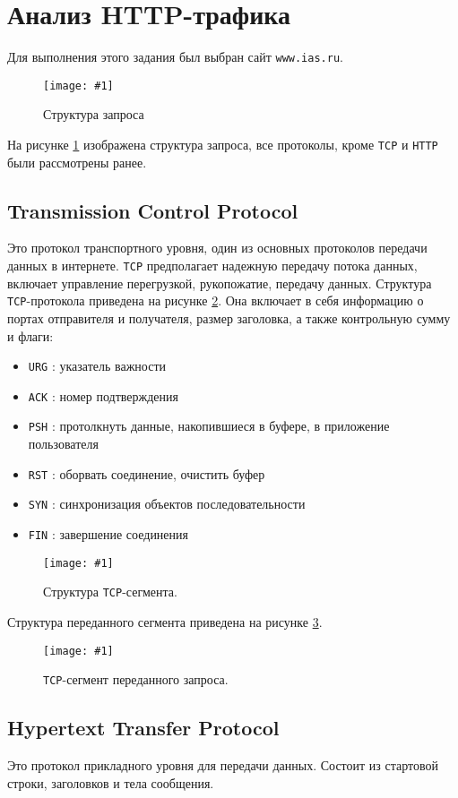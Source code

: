 \documentclass[12pt, a4paper]{article}
\newcommand{\figc}[4]{
  \begin{figure}[h]
  \begin{center}
    \texttt{[image: \#1]}
    \caption{#2}
    \label{fig:#3}
  \end{center}
  \end{figure}
}
\begin{document}
\section{Анализ HTTP-трафика}

Для выполнения этого задания был выбран сайт \texttt{www.ias.ru}.

\figc{http_headers}{Структура запроса}{h_h}{3.0}

На рисунке \ref{fig:h_h} изображена структура запроса, все протоколы, кроме
\texttt{TCP} и \texttt{HTTP} были рассмотрены ранее.

\subsection{Transmission Control Protocol}

Это протокол транспортного уровня, один из основных протоколов передачи данных
в интернете. \texttt{TCP} предполагает надежную передачу потока данных, включает
управление перегрузкой, рукопожатие, передачу данных. Структура \texttt{TCP}-протокола
приведена на рисунке \ref{fig:tcp_s}. Она включает в себя информацию о портах
отправителя и получателя, размер заголовка, а также контрольную сумму и флаги:

\begin{itemize}
  \item \texttt{URG} : указатель важности
  \item \texttt{ACK} : номер подтверждения
  \item \texttt{PSH} : протолкнуть данные, накопившиеся в буфере, в приложение
    пользователя
  \item \texttt{RST} : оборвать соединение, очистить буфер
  \item \texttt{SYN} : синхронизация объектов последовательности
  \item \texttt{FIN} : завершение соединения
\end{itemize}

\figc{tcp_header}{Структура \texttt{TCP}-сегмента.}{tcp_s}{1.7}

Структура переданного сегмента приведена на рисунке \ref{fig:tcp_d}.

\figc{http_tcp}{\texttt{TCP}-сегмент переданного запроса.}{tcp_d}{3.0}

\subsection{Hypertext Transfer Protocol}

Это протокол прикладного уровня для передачи данных. Состоит из стартовой
строки, заголовков и тела сообщения.
\end{document}
